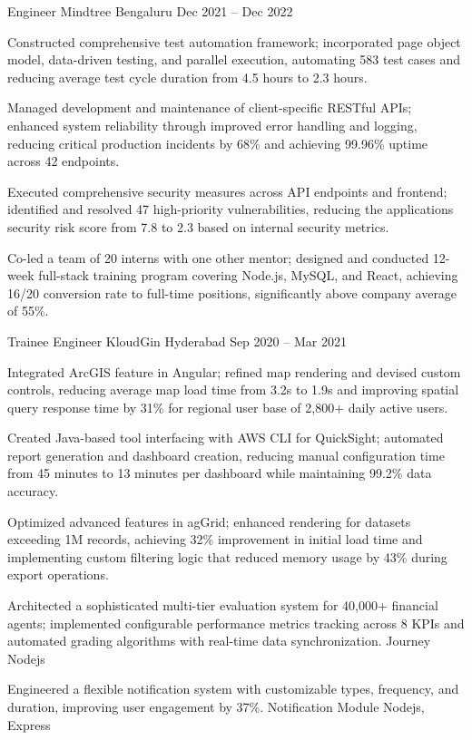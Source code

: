\documentclass[]{awesome-cv}
\begin{document}
\begin{cventries}
{\begin{cvitems}
		\end{cvitems}}
	\cventry
	{Engineer}
	{Mindtree}
	{Bengaluru}
	{Dec 2021 – Dec 2022}
	{\begin{cvitems}
		\item {Constructed comprehensive test automation framework; incorporated page object model, data-driven testing, and parallel execution, automating 583 test cases and reducing average test cycle duration from 4.5 hours to 2.3 hours.}
		\item {Managed development and maintenance of client-specific RESTful APIs; enhanced system reliability through improved error handling and logging, reducing critical production incidents by 68\% and achieving 99.96\% uptime across 42 endpoints.}
		\item {Executed comprehensive security measures across API endpoints and frontend; identified and resolved 47 high-priority vulnerabilities, reducing the application\textquotesingle{}s security risk score from 7.8 to 2.3 based on internal security metrics.}
		\item {Co-led a team of 20 interns with one other mentor; designed and conducted 12-week full-stack training program covering Node.js, MySQL, and React, achieving 16/20 conversion rate to full-time positions, significantly above company average of 55\%.}
		\end{cvitems}}
	\cventry
	{Trainee Engineer}
	{KloudGin}
	{Hyderabad}
	{Sep 2020 – Mar 2021}
	{\begin{cvitems}
		\item {Integrated ArcGIS feature in Angular; refined map rendering and devised custom controls, reducing average map load time from 3.2s to 1.9s and improving spatial query response time by 31\% for regional user base of 2,800+ daily active users.}
		\item {Created Java-based tool interfacing with AWS CLI for QuickSight; automated report generation and dashboard creation, reducing manual configuration time from 45 minutes to 13 minutes per dashboard while maintaining 99.2\% data accuracy.}
		\item {Optimized advanced features in agGrid; enhanced rendering for datasets exceeding 1M records, achieving 32\% improvement in initial load time and implementing custom filtering logic that reduced memory usage by 43\% during export operations.}
		\end{cvitems}}
\end{cventries}
\begin{cventries}
	\cventry
	{Architected a sophisticated multi-tier evaluation system for 40,000+ financial agents; implemented configurable performance metrics tracking across 8 KPIs and automated grading algorithms with real-time data synchronization.}
	{Journey}
	{Nodejs}
	{}
	{}
	
	\vspace{-5mm}
	\cventry
	{Engineered a flexible notification system with customizable types, frequency, and duration, improving user engagement by 37\%.}
	{Notification Module}
	{Nodejs, Express}
	{}
	{}
	
	\vspace{-5mm}
\end{cventries}
\end{document}
